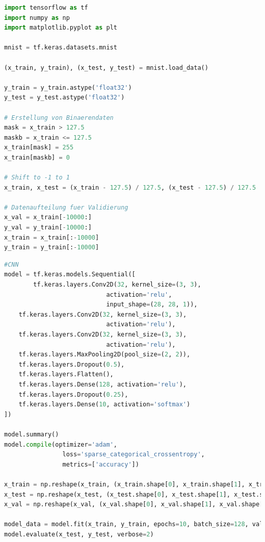 \begin{minipage}{\textwidth}
	\begin{lstlisting}[language=Python, caption=Pythoncode zur Testvorbereitung vom CNN, label=lst:test_prep_cnn]
import tensorflow as tf
import numpy as np
import matplotlib.pyplot as plt

mnist = tf.keras.datasets.mnist

(x_train, y_train), (x_test, y_test) = mnist.load_data()

y_train = y_train.astype('float32')
y_test = y_test.astype('float32')

# Erstellung von Binaerendaten 
mask = x_train > 127.5
maskb = x_train <= 127.5
x_train[mask] = 255
x_train[maskb] = 0

# Shift to -1 to 1
x_train, x_test = (x_train - 127.5) / 127.5, (x_test - 127.5) / 127.5

# Datenaufteilung fuer Validierung
x_val = x_train[-10000:]
y_val = y_train[-10000:]
x_train = x_train[:-10000]
y_train = y_train[:-10000]

	\end{lstlisting}
\end{minipage}

\begin{minipage}{\textwidth}
	\begin{lstlisting}[language=Python, caption=Pythoncode zur Konstuktion vom CNN, label=lst:test_cnn]
#CNN
model = tf.keras.models.Sequential([
		tf.keras.layers.Conv2D(32, kernel_size=(3, 3),
							activation='relu',
							input_shape=(28, 28, 1)),
	tf.keras.layers.Conv2D(32, kernel_size=(3, 3),
							activation='relu'),
	tf.keras.layers.Conv2D(32, kernel_size=(3, 3),
							activation='relu'),
	tf.keras.layers.MaxPooling2D(pool_size=(2, 2)),
	tf.keras.layers.Dropout(0.5),
	tf.keras.layers.Flatten(),
	tf.keras.layers.Dense(128, activation='relu'),
	tf.keras.layers.Dropout(0.25),
	tf.keras.layers.Dense(10, activation='softmax')
])

model.summary()
model.compile(optimizer='adam',
				loss='sparse_categorical_crossentropy',
				metrics=['accuracy'])

x_train = np.reshape(x_train, (x_train.shape[0], x_train.shape[1], x_train.shape[2], 1))
x_test = np.reshape(x_test, (x_test.shape[0], x_test.shape[1], x_test.shape[2], 1))
x_val = np.reshape(x_val, (x_val.shape[0], x_val.shape[1], x_val.shape[2], 1))
				
model_data = model.fit(x_train, y_train, epochs=10, batch_size=128, validation_data=(x_val, y_val))
model.evaluate(x_test, y_test, verbose=2)
\end{lstlisting}
\end{minipage}

